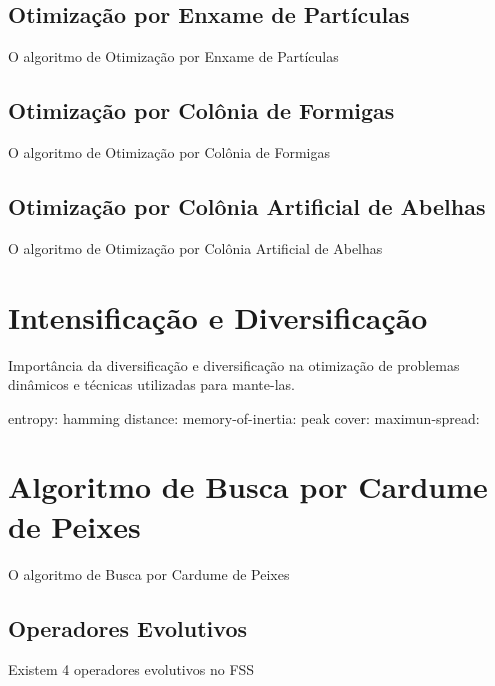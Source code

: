 \subsection{Otimização por Enxame de Partículas}
\label{sec:particle_swarm_optimization}
O algoritmo de Otimização por Enxame de Partículas

\subsection{Otimização por Colônia de Formigas}
\label{sec:ant_colony_optimization}
O algoritmo de Otimização por Colônia de Formigas

\subsection{Otimização por Colônia Artificial de Abelhas}
\label{sec:artificial_bee_colony}
O algoritmo de Otimização por Colônia Artificial de Abelhas

\section{Intensificação e Diversificação}
\label{sec:intesification_diversification}
Importância da diversificação e diversificação na otimização de problemas dinâmicos e técnicas utilizadas para mante-las.

entropy: \cite{mori2001adaptation}
hamming distance: \cite{rand2005measurements}
memory-of-inertia: \cite{morrison2001measurement}
peak cover: \cite{branke2012evolutionary}
maximun-spread: \cite{goh2009competitive}

\section{Algoritmo de Busca por Cardume de Peixes}
\label{sec:fish_school_search}
O algoritmo de Busca por Cardume de Peixes

\subsection{Operadores Evolutivos}
\label{sec:evolutionary_operators}
Existem 4 operadores evolutivos no FSS


